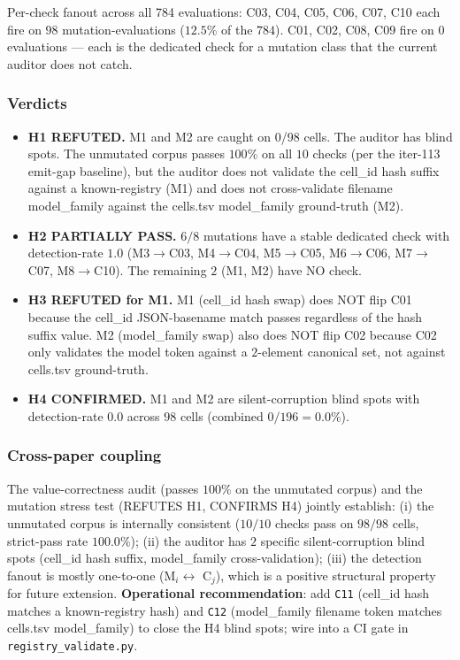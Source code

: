 \documentclass{article}  \usepackage[preprint,nonatbib]{neurips_2026} \usepackage[numbers]{natbib}
\begin{document}
Per-check fanout across all 784 evaluations: C03, C04, C05, C06, C07, C10
each fire on $98$ mutation-evaluations ($12.5\%$ of the $784$). C01, C02,
C08, C09 fire on $0$ evaluations --- each is the dedicated check for a
mutation class that the current auditor does not catch.

\subsubsection{Verdicts}

\begin{itemize}
  \item \textbf{H1 REFUTED.} M1 and M2 are caught on 0/98 cells. The
        auditor has blind spots. The unmutated corpus passes $100\%$
        on all $10$ checks (per the iter-113 emit-gap baseline),
        but the auditor does not validate the cell\_id hash suffix
        against a known-registry (M1) and does not cross-validate
        filename model\_family against the cells.tsv model\_family
        ground-truth (M2).
  \item \textbf{H2 PARTIALLY PASS.} $6/8$ mutations have a stable
        dedicated check with detection-rate $1.0$ (M3$\to$C03,
        M4$\to$C04, M5$\to$C05, M6$\to$C06, M7$\to$C07,
        M8$\to$C10). The remaining $2$ (M1, M2) have NO check.
  \item \textbf{H3 REFUTED for M1.} M1 (cell\_id hash swap) does NOT
        flip C01 because the cell\_id JSON-basename match passes
        regardless of the hash suffix value. M2 (model\_family swap)
        also does NOT flip C02 because C02 only validates the model
        token against a $2$-element canonical set, not against
        cells.tsv ground-truth.
  \item \textbf{H4 CONFIRMED.} M1 and M2 are silent-corruption blind
        spots with detection-rate $0.0$ across $98$ cells (combined
        $0/196 = 0.0\%$).
\end{itemize}

\subsubsection{Cross-paper coupling}

The value-correctness audit (passes $100\%$ on the unmutated corpus)
and the mutation stress test (REFUTES H1, CONFIRMS H4) jointly
establish: (i) the unmutated corpus is internally consistent
($10/10$ checks pass on $98/98$ cells, strict-pass rate $100.0\%$);
(ii) the auditor has $2$ specific silent-corruption blind spots
(cell\_id hash suffix, model\_family cross-validation); (iii) the
detection fanout is mostly one-to-one (M$_i \leftrightarrow$ C$_j$),
which is a positive structural property for future extension.
\textbf{Operational recommendation}: add \texttt{C11} (cell\_id hash
matches a known-registry hash) and \texttt{C12} (model\_family
filename token matches cells.tsv model\_family) to close the H4
blind spots; wire into a CI gate in \texttt{registry\_validate.py}.
\end{document}
